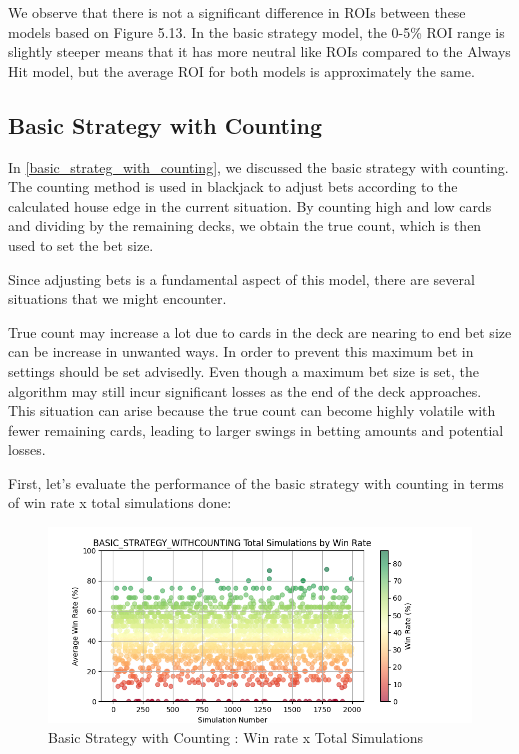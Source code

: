 \documentclass[a4paper,12pt]{report}
\begin{document}
We observe that there is not a significant difference in ROIs between these models based on Figure 5.13. In the basic strategy model, the 0-5\% ROI range is slightly steeper means that it has more neutral like ROIs compared to the Always Hit model, but the average ROI for both models is approximately the same.

\subsection{Basic Strategy with Counting}

In \ref{basic_strateg_with_counting}, we discussed the basic strategy with counting. The counting method is used in blackjack to adjust bets according to the calculated house edge in the current situation. By counting high and low cards and dividing by the remaining decks, we obtain the true count, which is then used to set the bet size.

Since adjusting bets is a fundamental aspect of this model, there are several situations that we might encounter. 

True count may increase a lot due to cards in the deck are nearing to end bet size can be increase in unwanted ways. In order to prevent this maximum bet in settings should be set advisedly. Even though a maximum bet size is set, the algorithm may still incur significant losses as the end of the deck approaches. This situation can arise because the true count can become highly volatile with fewer remaining cards, leading to larger swings in betting amounts and potential losses.

First, let's evaluate the performance of the basic strategy with counting in terms of win rate x total simulations done:

\begin{figure}[h]
\begin{center}
\includegraphics[scale=0.6]{figures/graphs/bsc_wr_ts.png}
\end{center}
\caption{Basic Strategy with Counting : Win rate x Total Simulations}
\label{fig:bsc_wr_ts}
\end{figure}
\end{document}
